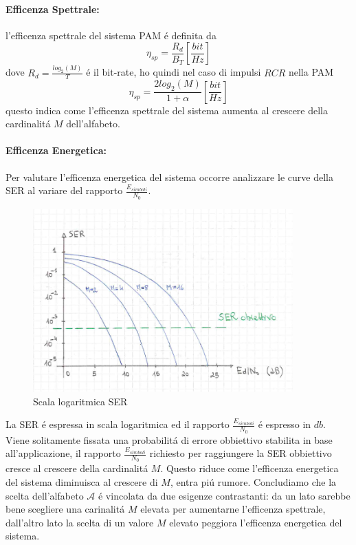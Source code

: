             \paragraph{Efficenza Spettrale: }\label{Efficenza Spettrale} l'efficenza spettrale del sistema PAM é definita da 
                \[
                    \eta_{sp} = \frac{R_d}{B_T} [\frac{bit}{Hz}]    
                \]
                dove $R_d=\frac{log_2(M)}{T}$ é il bit-rate, ho quindi nel caso di impulsi $RCR$ 
                nella PAM
                \[
                    \eta_{sp} = \frac{2log_2(M)}{1+\alpha} [\frac{bit}{Hz}]    
                \]
                questo indica come l'efficenza spettrale del sistema aumenta al crescere della cardinalitá $M$
                dell'alfabeto. 
            \paragraph{Efficenza Energetica: }\label{Efficenza Energetica}
                Per valutare l'efficenza energetica del sistema occorre analizzare le curve della SER 
                al variare del rapporto $\frac{E_{simboli}}{N_0}$.
                \begin{figure}[H]
                    \centering
                    \includegraphics[width = 10cm]{media/scala_logaritmica_ser.png}
                    \caption{Scala logaritmica SER}
                \end{figure}
                La SER é espressa in scala logaritmica ed il rapporto $\frac{E_{simboli}}{N_0}$ é espresso in $db$.
                Viene solitamente fissata una probabilitá di errore obbiettivo stabilita in base all'applicazione, il
                rapporto $\frac{E_{simboli}}{N_0}$ richiesto per raggiungere la SER obbiettivo cresce al crescere della 
                cardinalitá $M$. Questo riduce come l'efficenza energetica del sistema diminuisca al crescere di $M$, entra piú rumore.
                Concludiamo che la scelta dell'alfabeto $\mathcal{A}$ é vincolata da due esigenze contrastanti:
                da un lato sarebbe bene scegliere una carinalitá $M$ elevata per aumentarne l'efficenza spettrale, dall'altro
                lato la scelta di un valore $M$ elevato peggiora l'efficenza energetica del sistema.
